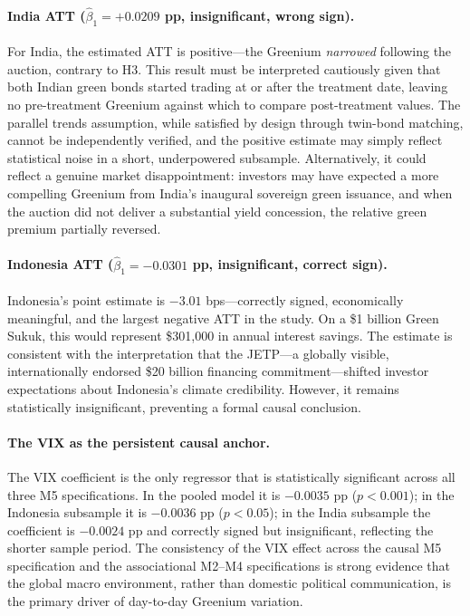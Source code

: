 \documentclass[12pt,a4paper]{article}
\begin{document}
\paragraph{India ATT ($\hat{\beta}_1 = +0.0209$ pp, insignificant, wrong sign).}

For India, the estimated ATT is positive---the Greenium \textit{narrowed} following the auction, contrary to H3. This result must be interpreted cautiously given that both Indian green bonds started trading at or after the treatment date, leaving no pre-treatment Greenium against which to compare post-treatment values. The parallel trends assumption, while satisfied by design through twin-bond matching, cannot be independently verified, and the positive estimate may simply reflect statistical noise in a short, underpowered subsample. Alternatively, it could reflect a genuine market disappointment: investors may have expected a more compelling Greenium from India's inaugural sovereign green issuance, and when the auction did not deliver a substantial yield concession, the relative green premium partially reversed.

\paragraph{Indonesia ATT ($\hat{\beta}_1 = -0.0301$ pp, insignificant, correct sign).}

Indonesia's point estimate is $-3.01$ bps---correctly signed, economically meaningful, and the largest negative ATT in the study. On a \$1 billion Green Sukuk, this would represent \$301,000 in annual interest savings. The estimate is consistent with the interpretation that the JETP---a globally visible, internationally endorsed \$20 billion financing commitment---shifted investor expectations about Indonesia's climate credibility. However, it remains statistically insignificant, preventing a formal causal conclusion.

\paragraph{The VIX as the persistent causal anchor.}

The VIX coefficient is the only regressor that is statistically significant across all three M5 specifications. In the pooled model it is $-0.0035$ pp ($p < 0.001$); in the Indonesia subsample it is $-0.0036$ pp ($p < 0.05$); in the India subsample the coefficient is $-0.0024$ pp and correctly signed but insignificant, reflecting the shorter sample period. The consistency of the VIX effect across the causal M5 specification and the associational M2--M4 specifications is strong evidence that the global macro environment, rather than domestic political communication, is the primary driver of day-to-day Greenium variation.
\end{document}
